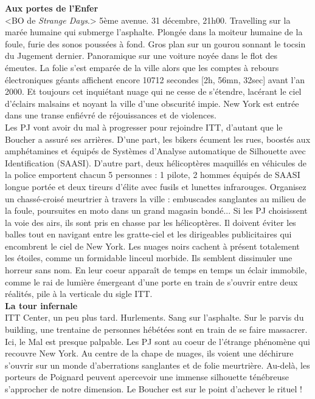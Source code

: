 \documentclass[11pt,twoside,a4paper]{book}
\begin{document}
\clearpage

\textbf{\large Aux portes de l'Enfer}~\\

<BO de \emph{Strange Days}.> 5{\`e}me avenue. 31 d{\'e}cembre, 21h00. Travelling sur la mar{\'e}e humaine qui submerge l'asphalte. Plong{\'e}e dans la moiteur humaine de la foule, furie des sonos pouss{\'e}es {\`a} fond. Gros plan sur un gourou sonnant le tocsin du Jugement dernier. Panoramique sur une voiture noy{\'e}e dans le flot des {\'e}meutes. La folie s'est empar{\'e}e de la ville alors que les comptes {\`a} rebours {\'e}lectroniques g{\'e}ants affichent encore 10712 secondes [2h, 56mn, 32sec] avant l'an 2000. Et toujours cet inqui{\'e}tant nuage qui ne cesse de s'{\'e}tendre, lac{\'e}rant le ciel d'{\'e}clairs malsains et noyant la ville d'une obscurit{\'e} impie. New York est entr{\'e}e dans une transe enfi{\'e}vr{\'e} de r{\'e}jouissances et de violences.~\\

Les PJ vont avoir du mal {\`a} progresser pour rejoindre ITT, d'autant que le Boucher a assur{\'e} ses arri{\`e}res. D'une part, les bikers {\'e}cument les rues, boost{\'e}s aux amph{\'e}tamines et {\'e}quip{\'e}s de Syst{\`e}mes d'Analyse automatique de Silhouette avec Identification (SAASI). D'autre part, deux h{\'e}licopt{\`e}res maquill{\'e}s en v{\'e}hicules de la police emportent chacun 5 personnes : 1 pilote, 2 hommes {\'e}quip{\'e}s de SAASI longue port{\'e}e et deux tireurs d'{\'e}lite avec fusils et lunettes infrarouges. Organisez un chass{\'e}-crois{\'e} meurtrier {\`a} travers la ville : embuscades sanglantes au milieu de la foule, poursuites en moto dans un grand magasin bond{\'e}... Si les PJ choisissent la voie des airs, ils sont pris en chasse par les h{\'e}licopt{\`e}res. Il doivent {\'e}viter les balles tout en navigant entre les gratte-ciel et les dirigeables publicitaires qui encombrent le ciel de New York. Les nuages noirs cachent {\`a} pr{\'e}sent totalement les {\'e}toiles, comme un formidable linceul morbide. Ils semblent dissimuler une horreur sans nom. En leur coeur appara{\^i}t de temps en temps un {\'e}clair immobile, comme le rai de lumi{\`e}re {\'e}mergeant d'une porte en train de s'ouvrir entre deux r{\'e}alit{\'e}s, pile {\`a} la verticale du sigle ITT.~\\

\textbf{\large La tour infernale}~\\

ITT Center, un peu plus tard. Hurlements. Sang sur l'asphalte. Sur le parvis du building, une trentaine de personnes h{\'e}b{\'e}t{\'e}es sont en train de se faire massacrer. Ici, le Mal est presque palpable. Les PJ sont au coeur de l'{\'e}trange ph{\'e}nom{\`e}ne qui recouvre New York. Au centre de la chape de nuages, ils voient une d{\'e}chirure s'ouvrir sur un monde d'aberrations sanglantes et de folie meurtri{\`e}re. Au-del{\`a}, les porteurs de Poignard peuvent apercevoir une immense silhouette t{\'e}n{\'e}breuse s'approcher de notre dimension. Le Boucher est sur le point d'achever le rituel !~\\
\end{document}
